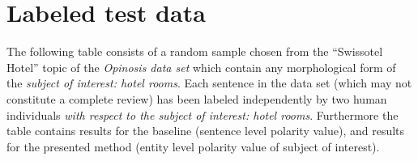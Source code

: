 \chapter{Labeled test data}
\label{chap:testData}

The following table consists of a random sample chosen from the ``Swissotel Hotel'' topic of the \emph{Opinosis data set} \cite{Opinosis} which contain any morphological form of the \emph{subject of interest: hotel rooms}. Each sentence in the data set (which may not constitute a complete review) has been labeled independently by two human individuals \emph{with respect to the subject of interest: hotel rooms}. Furthermore the table contains results for the baseline (sentence level polarity value), and results for the presented method (entity level polarity value of subject of interest).

